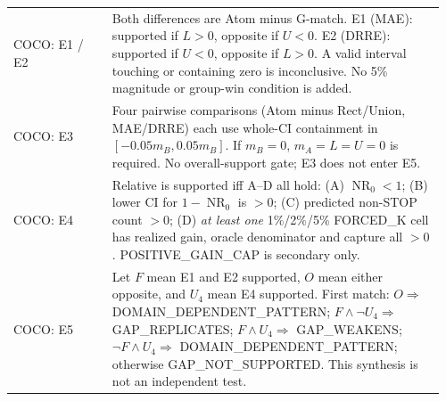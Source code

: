 \begin{center}
\begin{minipage}{\linewidth}
\begin{tabular}{@{}p{0.22\linewidth}p{0.74\linewidth}@{}}
COCO: E1 / E2 & Both differences are Atom minus G-match. E1 (MAE): supported if $L>0$, opposite if $U<0$. E2 (DRRE): supported if $U<0$, opposite if $L>0$. A valid interval touching or containing zero is inconclusive. No 5\% magnitude or group-win condition is added.\\[3pt]
COCO: E3 & Four pairwise comparisons (Atom minus Rect/Union, MAE/DRRE) each use whole-CI containment in $[-0.05m_B,0.05m_B]$. If $m_B=0$, $m_A=L=U=0$ is required. No overall-support gate; E3 does not enter E5.\\[3pt]
COCO: E4 & Relative is supported iff A--D all hold: (A) $\operatorname{NR}_0<1$; (B) lower CI for $1-\operatorname{NR}_0$ is $>0$; (C) predicted non-STOP count $>0$; (D) \emph{at least one} 1\%/2\%/5\% FORCED\_K cell has realized gain, oracle denominator and capture all $>0$. POSITIVE\_GAIN\_CAP is secondary only.\\[3pt]
COCO: E5 & Let $F$ mean E1 and E2 supported, $O$ mean either opposite, and $U_4$ mean E4 supported. First match: $O\Rightarrow$ DOMAIN\_DEPENDENT\_PATTERN; $F\land\neg U_4\Rightarrow$ GAP\_REPLICATES; $F\land U_4\Rightarrow$ GAP\_WEAKENS; $\neg F\land U_4\Rightarrow$ DOMAIN\_DEPENDENT\_PATTERN; otherwise GAP\_NOT\_SUPPORTED. This synthesis is not an independent test.\\
\bottomrule\end{tabular}
\end{minipage}\end{center}
